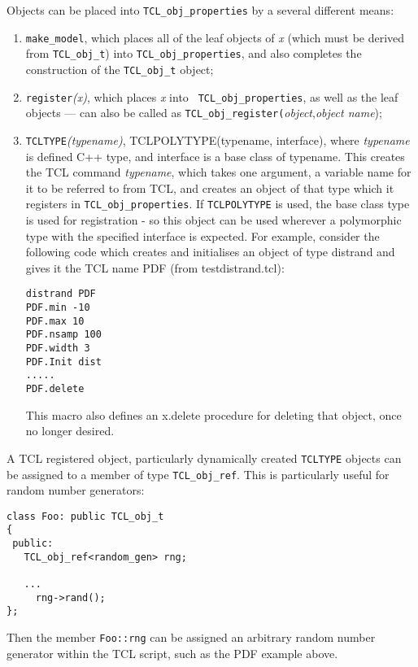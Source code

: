 Objects can be placed into {\tt TCL\_obj\_properties} by a several
different means:
\begin{enumerate}
\item {\tt make\_model}, which places all
  of the leaf objects of {\em x} (which must be derived from
  \verb+TCL_obj_t+) into {\tt TCL\_obj\_properties}, and also
  completes the construction of the \verb+TCL_obj_t+ object;
\item {\tt register}{\em (x)}, which places {\em x} into {\tt
    TCL\_obj\_properties}, as well as the leaf objects --- can also be
    called as \verb+TCL_obj_register(+{\em object},{\em object name});
\item {\tt TCLTYPE}{\em (typename)}\label{TCLTYPE},
TCLPOLYTYPE(typename, interface), where {\em
    typename} is defined C++ type, and interface is a base class of typename. This creates the TCL command {\em
    typename}, which takes one argument, a variable name for it to be
  referred to from TCL, and creates an object of that type which it
  registers in {\tt TCL\_obj\_properties}. If {\tt TCLPOLYTYPE} is
  used, the base class type is used for registration - so this object
  can be used wherever a polymorphic type with the specified interface
  is expected. For example, consider the
  following code which creates and initialises an object of type
  distrand and gives it the TCL name PDF (from
  testdistrand.tcl):
\begin{verbatim}
distrand PDF
PDF.min -10
PDF.max 10
PDF.nsamp 100
PDF.width 3
PDF.Init dist
.....
PDF.delete
\end{verbatim}
  This macro also defines an x.delete procedure for
  deleting that object, once no longer desired.
\end{enumerate}

A TCL registered object, particularly dynamically created
\verb+TCLTYPE+ objects can be assigned to a member of type
\verb+TCL_obj_ref+. This is particularly useful
for random number generators:

\begin{verbatim}
class Foo: public TCL_obj_t
{
 public:
   TCL_obj_ref<random_gen> rng;

   ...
     rng->rand();
};
\end{verbatim}

Then the member \verb+Foo::rng+ can be assigned an arbitrary random number
generator within the TCL script, such as the PDF example above.

